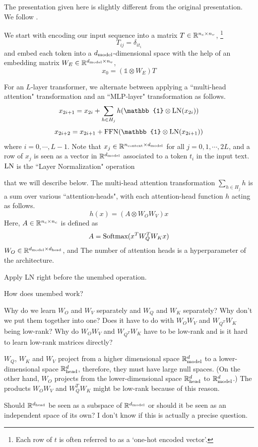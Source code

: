 The presentation given here is slightly different from the original presentation. We follow \cite{elhage2021mathematical}.

We start with encoding our input sequence into a matrix $T \in \mathbb{R}^{n_c \times n_v}$,
\footnote{Each row of $t$ is often referred to as a `one-hot encoded vector'.}
\[
T_{ij} = \delta_{i t_i}
\]
and embed each token into a $d_{\text{model}}$-dimensional space with the help of an embedding matrix $W_E \in \mathbb{R}^{d_{\text{model}} \times n_v}$,
\[
x_0 = (\mathbb{1} \otimes W_E) T
\]


For an $L$-layer transformer, we alternate between applying a ``multi-head attention" transformation and an ``MLP-layer" transformation as follows. 
\[
x_{2i+1} = x_{2i} + \sum_{h \in H_j} h(\mathbb{1} \otimes \LN(x_{2i})) 
\]
\[
x_{2i + 2} = x_{2i + 1} + \FFN(\mathbb{1} \otimes \LN(x_{2i + 1}))
\]
where $i=0, \cdots, L-1$. Note that $x_j \in \mathbb{R}^{n_{\text{context}} \times d_{\text{model}}}$ for all $j = 0, 1, \cdots, 2L$, and a row of $x_j$ is seen as a vector in $\mathbb{R}^{d_{\text{model}}}$ associated to a token $t_i$ in the input text. $\text{LN}$ is the ``Layer Normalization" operation  


that we will describe below. The multi-head attention transformation $\sum_{h \in H_j} h$ is a sum over various ``attention-heads", with each attention-head function $h$ acting as follows.
\[
h(x) = (A \otimes W_O W_V) x
\]
Here, $A \in \mathbb{R}^{n_c \times n_c}$ is defined as
\[
A = \text{Softmax}(x^T W_Q^T W_K x)
\] 
$W_O \in \mathbb{R}^{d_{\text{model}} \times d_{\text{head}}}$, and 
The number of attention heads is a hyperparameter of the architecture.


Apply LN right before the unembed operation. 

How does unembed work? 

Why do we learn $W_O$ and $W_V$ separately and $W_Q$ and $W_K$ separately? Why don't we put them together into one? Does it have to do with $W_O W_V$ and $W_{Q^T} W_K$ being low-rank? Why do $W_O W_V$ and $W_{Q^T} W_K$ have to be low-rank and is it hard to learn low-rank matrices directly? 

$W_Q$, $W_K$ and $W_V$ project from a higher dimensional space $\mathbb{R}^d_{\text{model}}$ to a lower-dimensional space $\mathbb{R}^d_{\text{head}}$, therefore, they must have large null spaces. (On the other hand, $W_O$ projects from the lower-dimensional space $\mathbb{R}^d_{\text{head}}$ to $\mathbb{R}^d_{\text{model}}$.) The products $W_O W_V$ and  $W_Q^T W_K$ might be low-rank because of this reason.

Should $\mathbb{R}^{d_{\text{head}}}$ be seen as a subspace of $\mathbb{R}^{d_{\text{model}}}$ or should it be seen as an independent space of its own? I don't know if this is actually a precise question. 

